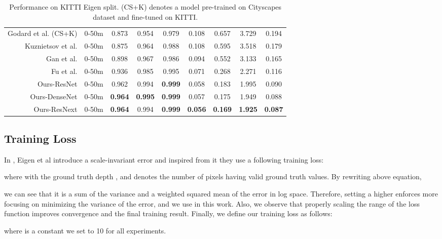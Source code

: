 \documentclass[10pt,twocolumn,letterpaper]{article}
\begin{document}
\begin{table*}[t!]
{\begin{tabular}{r|l|ccc|cccc}
			Godard et al. (CS+K) \cite{godard2017unsupervised} & 0-50m & 0.873 & 0.954 & 0.979 & 0.108 & 0.657 & 3.729 & 0.194 \\
			Kuznietsov et al. \cite{kuznietsov2017semi}        & 0-50m & 0.875 & 0.964 & 0.988 & 0.108 & 0.595 & 3.518 & 0.179 \\
			Gan et al. \cite{gan2018monocular}                 & 0-50m & 0.898 & 0.967 & 0.986 & 0.094 & 0.552 & 3.133 & 0.165 \\
			Fu et al. \cite{fu2018deep}                        & 0-50m & 0.936 & 0.985 & 0.995 & 0.071 & 0.268 & 2.271 & 0.116 \\ \hline
			Ours-ResNet                                        & 0-50m & 0.962 & 0.994 & \bf{0.999} & 0.058 & 0.183 & 1.995 & 0.090 \\			
			Ours-DenseNet                                      & 0-50m & \bf{0.964} & \bf{0.995} & \bf{0.999} & 0.057 & 0.175 & 1.949 & 0.088 \\
			Ours-ResNext                                       & 0-50m & \bf{0.964} & 0.994 & \bf{0.999} & \bf{0.056} & \bf{0.169} & \bf{1.925} & \bf{0.087} \\ \hline
		\end{tabular}
	}
	\caption{Performance on KITTI Eigen split.
	(CS+K) denotes a model pre-trained on Cityscapes dataset \cite{cordts2016cityscapes} and fine-tuned on KITTI.
}
	\label{tb:result_kitti_eigen}
\end{table*}

\subsection{Training Loss}
\label{sec:training_loss}
In \cite{eigen2014depth}, Eigen et al introduce a scale-invariant error and inspired from it they use a following training loss:

where  with the ground truth depth ,  and  denotes the number of pixels having valid ground truth values.
By rewriting above equation,

we can see that it is a sum of the variance and a weighted squared mean of the error in log space.
Therefore, setting a higher  enforces more focusing on minimizing the variance of the error, and we use  in this work.
Also, we observe that properly scaling the range of the loss function improves convergence and the final training result.
Finally, we define our training loss  as follows:

where  is a constant we set to 10 for all experiments.
\end{document}
